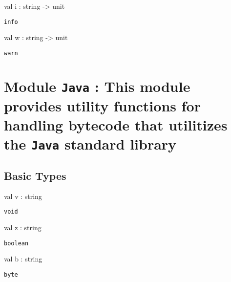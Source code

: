 \documentclass[11pt]{article}
\begin{document}
\label{val:Log.i}\begin{ocamldoccode}
val i : string -> unit
\end{ocamldoccode}
\begin{ocamldocdescription}
{\tt{info}}


\end{ocamldocdescription}




\label{val:Log.w}\begin{ocamldoccode}
val w : string -> unit
\end{ocamldoccode}
\begin{ocamldocdescription}
{\tt{warn}}


\end{ocamldocdescription}


\section{Module {\tt{Java}} : This module provides utility functions for handling bytecode that
    utilitizes the {\tt{Java}} standard library}
\label{module:Java}




\ocamldocvspace{0.5cm}



\subsection{Basic Types}




\label{val:Java.v}\begin{ocamldoccode}
val v : string
\end{ocamldoccode}
\begin{ocamldocdescription}
{\tt{void}}


\end{ocamldocdescription}




\label{val:Java.z}\begin{ocamldoccode}
val z : string
\end{ocamldoccode}
\begin{ocamldocdescription}
{\tt{boolean}}


\end{ocamldocdescription}




\label{val:Java.b}\begin{ocamldoccode}
val b : string
\end{ocamldoccode}
\begin{ocamldocdescription}
{\tt{byte}}


\end{ocamldocdescription}
\end{document}
